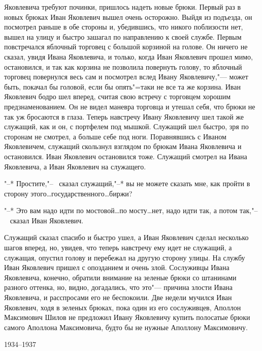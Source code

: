 Яковлевича требуют починки, пришлось надеть новые брюки. Первый раз в новых брюках Иван Яковлевич вышел очень осторожно. Выйдя из подъезда, он посмотрел раньше в обе стороны и, убедившись, что никого поблизости нет, вышел на улицу и быстро зашагал по направлению к своей службе. Первым повстречался яблочный торговец с большой корзиной на голове. Он ничего не сказал, увидя Ивана Яковлевича, и только, когда Иван Яковлевич прошел мимо, остановился, и так как корзина не позволила повернуть голову, то яблочный торговец повернулся весь сам и посмотрел вслед Ивану Яковлевичу,"--- может быть, покачал бы головой, если бы опять"=таки не все та же корзина. Иван Яковлевич бодро шел вперед, считая свою встречу с торговцем хорошим предзнаменованием. Он не видел маневра торговца и утешал себя, что брюки не так уж бросаются в глаза. Теперь навстречу Ивану Яковлевичу шел такой же служащий, как и он, с портфелем под мышкой. Служащий шел быстро, зря по сторонам не смотрел, а больше себе под ноги. Поравнявшись с Иваном Яковлевичем, служащий скользнул взглядом по брюкам Ивана Яковлевича и остановился. Иван Яковлевич остановился тоже. Служащий смотрел на Ивана Яковлевича, а Иван Яковлевич на служащего.

"--* Простите,"--~ сказал служащий,"--* вы не можете сказать мне, как пройти в сторону этого\dots государственного\dots биржи? 

"--* Это вам надо идти по мостовой\dots по мосту\dots нет, надо идти так, а потом так,"--~ сказал Иван Яковлевич.

Служащий сказал спасибо и быстро ушел, а Иван Яковлевич сделал несколько шагов вперед, но, увидев, что теперь навстречу ему идет не служащий, а служащая, опустил голову и перебежал на другую сторону улицы. На службу Иван Яковлевич пришел с опозданием и очень злой. Сослуживцы Ивана Яковлевича, конечно, обратили внимание на зеленые брюки со штанинами разного оттенка, но, видно, догадались, что это"---  причина злости Ивана Яковлевича, и расспросами его не беспокоили. Две недели мучился Иван Яковлевич, ходя в зеленых брюках, пока один из его сослуживцев, Аполлон Максимович Шилов не предложил Ивану Яковлевичу купить полосатые брюки самого Аполлона Максимовича, будто бы не нужные Аполлону Максимовичу.

\begin{flushright}
1934--1937
\end{flushright}